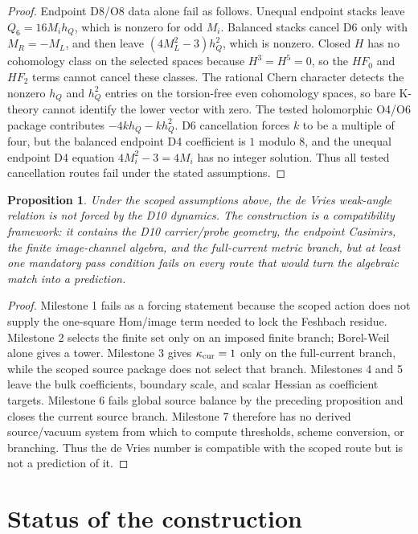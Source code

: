 \documentclass[11pt]{article}
\theoremstyle{plain}
\newtheorem{proposition}{Proposition}[section]
\theoremstyle{definition}
\begin{document}
\begin{proof}
Endpoint D8/O8 data alone fail as follows.  Unequal endpoint stacks leave
\(Q_6=16M_i h_Q\), which is nonzero for odd \(M_i\).  Balanced stacks cancel
D6 only with \(M_R=-M_L\), and then leave
\((4M_L^2-3)h_Q^2\), which is nonzero.  Closed \(H\) has no cohomology class on
the selected spaces because \(H^3=H^5=0\), so the \(HF_0\) and \(HF_2\) terms
cannot cancel these classes.  The rational Chern character detects the
nonzero \(h_Q\) and \(h_Q^2\) entries on the torsion-free even cohomology
spaces, so bare K-theory cannot identify the lower vector with zero.  The
tested holomorphic O4/O6 package contributes \(-4k h_Q-kh_Q^2\).  D6
cancellation forces \(k\) to be a multiple of four, but the balanced endpoint
D4 coefficient is \(1\) modulo \(8\), and the unequal endpoint D4 equation
\(4M_i^2-3=4M_i\) has no integer solution.  Thus all tested cancellation
routes fail under the stated assumptions.
\end{proof}

\begin{proposition}
Under the scoped assumptions above, the de Vries weak-angle relation is not
forced by the D10 dynamics.  The construction is a
compatibility framework: it contains the D10 carrier/probe geometry, the
endpoint Casimirs, the finite image-channel algebra, and the full-current
metric branch, but at least one mandatory pass condition fails on every route
that would turn the algebraic match into a prediction.
\end{proposition}

\begin{proof}
Milestone 1 fails as a forcing statement because the scoped action does not
supply the one-square Hom/image term needed to lock the Feshbach residue.
Milestone 2 selects the finite set only on an imposed finite branch; Borel-Weil
alone gives a tower.  Milestone 3 gives \(\kappa_{\rm cur}=1\) only on the
full-current branch, while the scoped source package does not select that
branch.  Milestones 4 and 5 leave the bulk coefficients, boundary scale, and
scalar Hessian as coefficient targets.  Milestone 6 fails global source balance
by the preceding proposition and closes the current source branch.  Milestone 7
therefore has no derived source/vacuum system from which to compute thresholds,
scheme conversion, or branching.  Thus the de Vries number is compatible with
the scoped route but is not a prediction of it.
\end{proof}

\section{Status of the construction}
\end{document}
